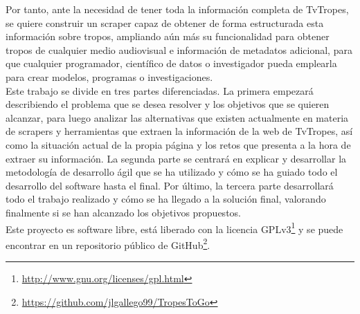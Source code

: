 Por tanto, ante la necesidad de tener toda la información completa de TvTropes, se quiere construir un scraper capaz de obtener de forma estructurada esta información sobre tropos, ampliando aún más su funcionalidad para obtener tropos de cualquier medio audiovisual e información de metadatos adicional, para que cualquier programador, científico de datos o investigador pueda emplearla para crear modelos, programas o investigaciones.\\

Este trabajo se divide en tres partes diferenciadas. La primera empezará describiendo el problema que se desea resolver y los objetivos que se quieren alcanzar, para luego analizar las alternativas que existen actualmente en materia de scrapers y herramientas que extraen la información de la web de TvTropes, así como la situación actual de la propia página y los retos que presenta a la hora de extraer su información. La segunda parte se centrará en explicar y desarrollar la metodología de desarrollo ágil que se ha utilizado y cómo se ha guiado todo el desarrollo del software hasta el final. Por último, la tercera parte desarrollará todo el trabajo realizado y cómo se ha llegado a la solución final, valorando finalmente si se han alcanzado los objetivos propuestos.\\

Este proyecto es software libre, está liberado con la licencia GPLv3\footnote{\url{http://www.gnu.org/licenses/gpl.html}} y se puede encontrar en un repositorio público de GitHub\footnote{\url{https://github.com/jlgallego99/TropesToGo}}.
